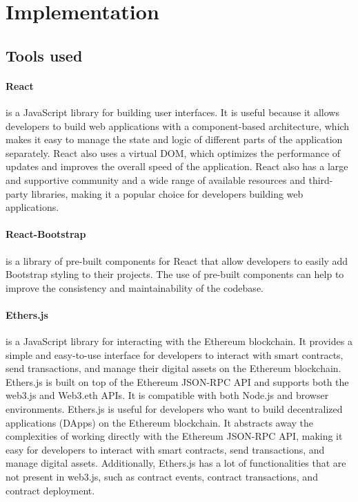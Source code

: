 \section{Implementation}\label{sec:implementation}
\subsection{Tools used}
\paragraph{React} is a JavaScript library for building user interfaces. It is useful because it allows developers to build web applications with a component-based architecture, which makes it easy to manage the state and logic of different parts of the application separately. React also uses a virtual DOM, which optimizes the performance of updates and improves the overall speed of the application. React also has a large and supportive community and a wide range of available resources and third-party libraries, making it a popular choice for developers building web applications.\cite{react}
\paragraph{React-Bootstrap} is a library of pre-built components for React that allow developers to easily add Bootstrap styling to their projects. The use of pre-built components can help to improve the consistency and maintainability of the codebase. \cite{reactbootstrap}
\paragraph{Ethers.js} is a JavaScript library for interacting with the Ethereum blockchain. It provides a simple and easy-to-use interface for developers to interact with smart contracts, send transactions, and manage their digital assets on the Ethereum blockchain. Ethers.js is built on top of the Ethereum JSON-RPC API and supports both the web3.js and Web3.eth APIs. It is compatible with both Node.js and browser environments.
Ethers.js is useful for developers who want to build decentralized applications (DApps) on the Ethereum blockchain. It abstracts away the complexities of working directly with the Ethereum JSON-RPC API, making it easy for developers to interact with smart contracts, send transactions, and manage digital assets. Additionally, Ethers.js has a lot of functionalities that are not present in web3.js, such as contract events, contract transactions, and contract deployment. \cite{ethersJS}
